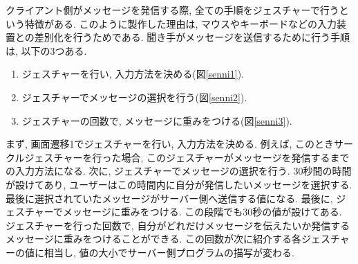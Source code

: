 \documentclass{funthesis}
\begin{document}
クライアント側がメッセージを発信する際, 全ての手順をジェスチャーで行うという特徴がある. このように製作した理由は, マウスやキーボードなどの入力装置との差別化を行うためである. 聞き手がメッセージを送信するために行う手順は, 以下の3つある. 
\begin{enumerate}
 \item ジェスチャーを行い, 入力方法を決める(図\ref{senni1}). 
 \item ジェスチャーでメッセージの選択を行う(図\ref{senni2}). 
 \item ジェスチャーの回数で, メッセージに重みをつける(図\ref{senni3}). 
\end{enumerate}

まず, 画面遷移1でジェスチャーを行い, 入力方法を決める. 例えば, このときサークルジェスチャーを行った場合, このジェスチャーがメッセージを発信するまでの入力方法になる. 
次に, ジェスチャーでメッセージの選択を行う. 30秒間の時間が設けてあり, ユーザーはこの時間内に自分が発信したいメッセージを選択する. 最後に選択されていたメッセージがサーバー側へ送信する値になる. %
最後に, ジェスチャーでメッセージに重みをつける. この段階でも30秒の値が設けてある. ジェスチャーを行った回数で, 自分がどれだけメッセージを伝えたいか発信するメッセージに重みをつけることができる. この回数が次に紹介する各ジェスチャーの値に相当し, 値の大小でサーバー側プログラムの描写が変わる. 
\end{document}
